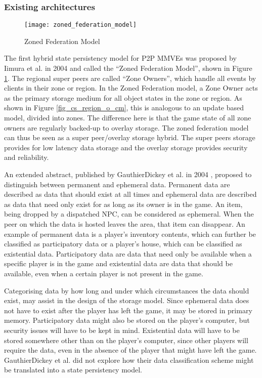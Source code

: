 \subsubsection{Existing architectures}

\begin{figure}[htbp]
 \centering
 \texttt{[image: zoned\_federation\_model]}
 \caption{Zoned Federation Model \cite{zoned_federation}}
 \label{fig_zoned_federation_model}
\end{figure}
%
The first hybrid state persistency model for P2P MMVEs was proposed by Iimura et al. in 2004 \cite{zoned_federation} and called the ``Zoned Federation Model'', shown in Figure \ref{fig_zoned_federation_model}. The regional super peers are called ``Zone Owners'', which handle all events by clients in their zone or region. In the Zoned Federation model, a Zone Owner acts as the primary storage medium for all object states in the zone or region. As shown in Figure \ref{fig_cs_region_o_cm}, this is analogous to an update based model, divided into zones. The difference here is that the game state of all zone owners are regularly backed-up to overlay storage. The zoned federation model can thus be seen as a super peer/overlay storage hybrid. The super peers storage provides for low latency data storage and the overlay storage provides security and reliability.

An extended abstract, published by GauthierDickey et al. in 2004 \cite{hybrid_storage1}, proposed to distinguish between permanent and ephemeral data. Permanent data are described as data that should exist at all times and ephemeral data are described as data that need only exist for as long as its owner is in the game. An item, being dropped by a dispatched NPC, can be considered as ephemeral. When the peer on which the data is hosted leaves the area, that item can disappear. An example of permanent data is a player's inventory contents, which can further be classified as participatory data or a player's house, which can be classified as existential data. Participatory data are data that need only be available when a specific player is in the game and existential data are data that should be available, even when a certain player is not present in the game.

Categorising data by how long and under which circumstances the data should exist, may assist in the design of the storage model. Since ephemeral data does not have to exist after the player has left the game, it may be stored in primary memory. Participatory data might also be stored on the player's computer, but security issues will have to be kept in mind. Existential data will have to be stored somewhere other than on the player's computer, since other players will require the data, even in the absence of the player that might have left the game. GauthierDickey et al. did not explore how their data classification scheme might be translated into a state persistency model.

